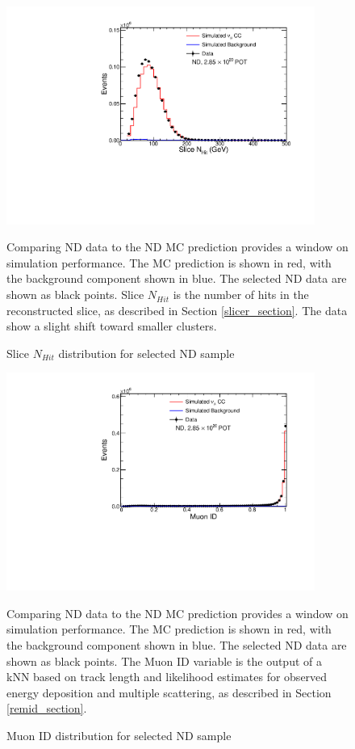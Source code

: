 \begin{figure}
\begin{center}
\includegraphics[width=0.9\textwidth]{figures/selection_nd/slcNHit_NumuContainND_CVN.pdf}
\end{center}
\caption{Slice $N_{Hit}$ distribution for selected ND sample}{
Comparing ND data to the ND MC prediction provides a window on simulation
performance.  The MC prediction is shown in red, with the background
component shown in blue.
The selected ND data are shown as black points.
Slice $N_{Hit}$ is the number of hits in the reconstructed slice,
as described in Section \ref{slicer_section}.
The data show a slight shift toward smaller clusters.
}
\label{nd_selected_slcNHit}
\end{figure}


\begin{figure}
\begin{center}
\includegraphics[width=0.9\textwidth]{figures/selection_nd/remid_NumuContainND_CVN.pdf}
\end{center}
\caption{Muon ID distribution for selected ND sample}{
Comparing ND data to the ND MC prediction provides a window on simulation
performance.  The MC prediction is shown in red, with the background
component shown in blue.
The selected ND data are shown as black points.
The Muon ID variable is the output of a kNN based on track length and
likelihood estimates for observed energy deposition and multiple scattering,
as described in Section \ref{remid_section}.}
\label{nd_selected_remid}
\end{figure}

